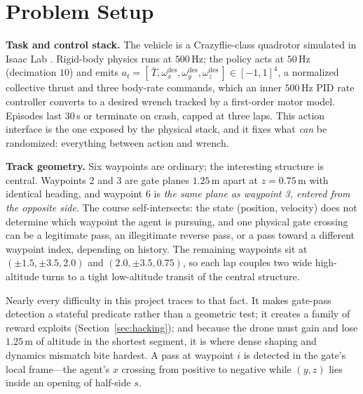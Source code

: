 \documentclass[10pt, twocolumn]{article}
\begin{document}
\section{Problem Setup}

\textbf{Task and control stack.} The vehicle is a Crazyflie-class quadrotor
simulated in Isaac Lab \cite{mittal2023}. Rigid-body physics runs at $500$\,Hz;
the policy acts at $50$\,Hz (decimation $10$) and emits
$a_t = [\,\bar{T}, \omega_x^{\text{des}}, \omega_y^{\text{des}},
\omega_z^{\text{des}}\,] \in [-1,1]^4$, a normalized collective thrust and
three body-rate commands, which an inner $500$\,Hz PID rate controller converts
to a desired wrench tracked by a first-order motor model. Episodes last $30$\,s
or terminate on crash, capped at three laps. This action interface is the one
exposed by the physical stack, and it fixes what \emph{can} be randomized:
everything between action and wrench.

\textbf{Track geometry.} Six waypoints are ordinary; the interesting structure
is central. Waypoints 2 and 3 are gate planes $1.25$\,m apart at $z = 0.75$\,m
with identical heading, and waypoint 6 is \emph{the same plane as waypoint 3,
entered from the opposite side}. The course self-intersects: the state
(position, velocity) does not determine which waypoint the agent is pursuing,
and one physical gate crossing can be a legitimate pass, an illegitimate
reverse pass, or a pass toward a different waypoint index, depending on
history. The remaining waypoints sit at $(\pm 1.5, \pm 3.5, 2.0)$ and
$(2.0, \pm 3.5, 0.75)$, so each lap couples two wide high-altitude turns to a
tight low-altitude transit of the central structure.

Nearly every difficulty in this project traces to that fact. It makes gate-pass
detection a stateful predicate rather than a geometric test; it creates a
family of reward exploits (Section~\ref{sec:hacking}); and because the drone
must gain and lose $1.25$\,m of altitude in the shortest segment, it is where
dense shaping and dynamics mismatch bite hardest. A pass at waypoint $i$ is detected in the
gate's local frame---the agent's $x$ crossing from positive to negative while
$(y,z)$ lies inside an opening of half-side $s$.
\end{document}
